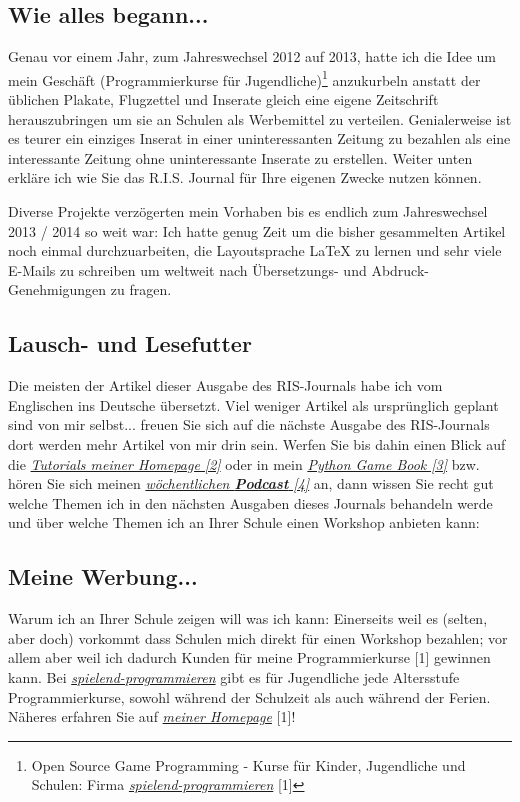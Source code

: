 \subsection*{Wie alles begann...}
Genau vor einem Jahr, zum Jahreswechsel 2012 auf 2013, hatte ich die Idee um mein Geschäft (Programmierkurse für Jugendliche)\footnote{Open Source Game Programming - Kurse für Kinder, Jugendliche und Schulen: Firma \href{http://spielend-programmieren.at}{\textit{spielend-programmieren}} [1]} anzukurbeln anstatt der üblichen Plakate, Flugzettel und Inserate gleich eine eigene Zeitschrift herauszubringen um sie an Schulen als Werbemittel zu verteilen. Genialerweise ist es teurer ein einziges Inserat in einer uninteressanten Zeitung zu bezahlen als eine interessante Zeitung ohne uninteressante Inserate zu erstellen. Weiter unten erkläre ich wie Sie das R.I.S. Journal für Ihre eigenen Zwecke nutzen können.

Diverse Projekte verzögerten mein Vorhaben bis es endlich zum Jahreswechsel 2013 / 2014 so weit war: Ich hatte genug Zeit um die bisher gesammelten Artikel noch einmal durchzuarbeiten, die Layoutsprache {\large \LaTeX} zu lernen und sehr viele E-Mails zu schreiben um weltweit nach Übersetzungs- und Abdruck-Genehmigungen zu fragen. 

\subsection*{Lausch- und Lesefutter}
Die meisten der Artikel dieser Ausgabe des RIS-Journals habe ich vom Englischen ins Deutsche übersetzt. Viel weniger Artikel als ursprünglich geplant sind von mir selbst... freuen Sie sich auf die nächste Ausgabe des RIS-Journals dort werden mehr Artikel von mir drin sein. Werfen Sie bis dahin einen Blick auf die \href{http://spielend-programmieren.at/de:tutorials:start}{\textit{Tutorials meiner Homepage [2]}} oder in mein \href{http://thepythongamebook.com}{\textit{Python Game Book [3]}} bzw. hören Sie sich meinen \href{http://biertaucher.at}{\textit{wöchentlichen \textbf{Podcast} [4]}} an, dann wissen Sie recht gut welche Themen ich in den nächsten Ausgaben dieses Journals behandeln werde und über welche Themen ich an Ihrer Schule einen Workshop anbieten kann:

\subsection*{Meine Werbung...}
Warum ich an Ihrer Schule zeigen will was ich kann: Einerseits weil es (selten, aber doch) vorkommt dass Schulen mich direkt für einen Workshop bezahlen; vor allem aber weil ich dadurch Kunden für meine Programmierkurse [1] gewinnen kann. Bei \href{http://spielend-programmieren.at}{\textit{spielend-programmieren}} gibt es für Jugendliche jede Altersstufe Programmierkurse, sowohl während der Schulzeit als auch während der Ferien. Näheres erfahren Sie auf \href{http://spielend-programmieren.at}{\textit{meiner Homepage}} [1]!


